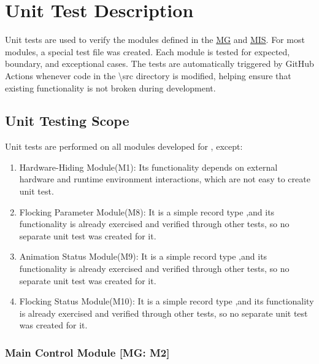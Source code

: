 \documentclass[12pt, titlepage]{article}
\begin{document}
\section{Unit Test Description} \label{sec_unittest}

Unit tests are used to verify the modules defined in the 
\href{https://mei0725.github.io/FlockingSimulator/Design/SoftArchitecture/MG.pdf}{MG} and 
\href{https://mei0725.github.io/FlockingSimulator/Design/SoftArchitecture/MIS.pdf}{MIS}. 
For most modules, a special test file was created. Each module is tested for 
expected, boundary, and exceptional cases. The tests are automatically 
triggered by GitHub Actions whenever code in the \textbackslash src directory 
is modified, helping ensure that existing functionality is not broken during 
development.

\subsection{Unit Testing Scope}

Unit tests are performed on all modules developed for \progname{}, except:
\begin{enumerate}
  \item Hardware-Hiding Module(M1): Its functionality depends on external 
  hardware and runtime environment interactions, which are not easy to create 
  unit test.
  \item Flocking Parameter Module(M8): It is a simple record type ,and its 
  functionality is already exercised and verified through other tests, so no 
  separate unit test was created for it.
  \item Animation Status Module(M9): It is a simple record type ,and its 
  functionality is already exercised and verified through other tests, so no 
  separate unit test was created for it.
  \item Flocking Status Module(M10): It is a simple record type ,and its 
  functionality is already exercised and verified through other tests, so no 
  separate unit test was created for it.
\end{enumerate}

\subsubsection{Main Control Module [MG: M2]} \label{UTMain}
\end{document}
